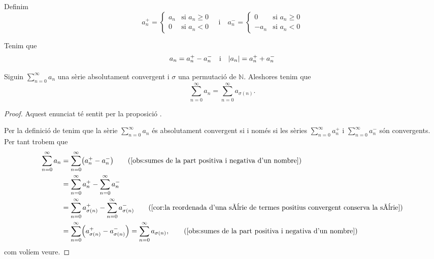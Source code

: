 \documentclass[../Apunts.tex]{subfiles}
\begin{document}
	\begin{notation}
		\label{notation:part positiva d'un nombre}
		\label{notation:part negativa d'un nombre}
		Definim
		\[a^{+}_{n}=\begin{cases}
			a_{n} & \text{si }a_{n}\geq0 \\
			0 & \text{si }a_{n}<0
		\end{cases}\quad\text{i}\quad
		a^{-}_{n}=\begin{cases}
			0 & \text{si }a_{n}\geq0 \\
			-a_{n} & \text{si }a_{n}<0
		\end{cases}\]
	\end{notation}
	\begin{observation}
		\label{obs:sumes de la part positiva i negativa d'un nombre}
		Tenim que
		\[a_{n}=a^{+}_{n}-a^{-}_{n}\quad\text{i}\quad\abs{a_{n}}=a^{+}_{n}+a^{-}_{n}\]
	\end{observation}
	\begin{lemma}
		Siguin \(\sum_{n=0}^{\infty}a_{n}\) una sèrie absolutament convergent i \(\sigma\) una permutació de \(\mathbb{N}\). Aleshores tenim que
		\[\sum_{n=0}^{\infty}a_{n}=\sum_{n=0}^{\infty}a_{\sigma(n)}.\]
		\begin{proof}
			Aquest enunciat té sentit per la proposició .
			
			Per la definició de  tenim que la sèrie \(\sum_{n=0}^{\infty}a_{n}\) és absolutament convergent si i només si les sèries \(\sum_{n=0}^{\infty}a^{+}_{n}\) i \(\sum_{n=0}^{\infty}a^{-}_{n}\) són convergents. Per tant trobem que
			\begin{align*}
				\sum_{n=0}^{\infty}a_{n}&=\sum_{n=0}^{\infty}\left(a^{+}_{n}-a^{-}_{n}\right) \tag{\ref{obs:sumes de la part positiva i negativa d'un nombre}}\\
				&=\sum_{n=0}^{\infty}a^{+}_{n}-\sum_{n=0}^{\infty}a^{-}_{n} \\
				&=\sum_{n=0}^{\infty}a^{+}_{\sigma(n)}-\sum_{n=0}^{\infty}a^{-}_{\sigma(n)} \tag{\ref{cor:la reordenada d'una sèrie de termes positius convergent conserva la sèrie}}\\
				&=\sum_{n=0}^{\infty}\left(a^{+}_{\sigma(n)}-a^{-}_{\sigma(n)}\right)=\sum_{n=0}^{\infty}a_{\sigma(n)}, \tag{\ref{obs:sumes de la part positiva i negativa d'un nombre}}
			\end{align*}
			com volíem veure.
		\end{proof}
	\end{lemma}
\end{document}
